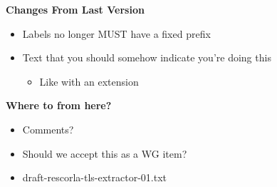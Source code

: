 \documentclass[helvetica]{seminar}
\newcommand{\heading}[1]{%
  \begin{center} 
    \large\bf 
    #1 
  \end{center} 
  \vspace{.4 in}}
\begin{document}
\begin{slide}
\heading{Changes From Last Version}

\begin{itemize}
\item Labels no longer MUST have a fixed prefix
\item Text that you should somehow indicate you're doing this
\begin{itemize}
\item Like with an extension
\end{itemize}
\end{itemize}

\end{slide}

\begin{slide}
\heading{Where to from here?}

\begin{itemize}
\item Comments?
\item Should we accept this as a WG item?
\item draft-rescorla-tls-extractor-01.txt
\end{itemize}

\end{slide}
\end{document}
